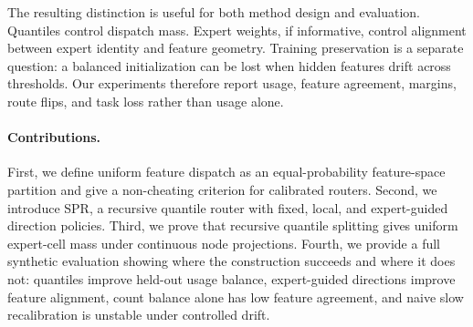 The resulting distinction is useful for both method design and evaluation.
Quantiles control dispatch mass.  Expert weights, if informative, control
alignment between expert identity and feature geometry.  Training preservation
is a separate question: a balanced initialization can be lost when hidden
features drift across thresholds.  Our experiments therefore report usage,
feature agreement, margins, route flips, and task loss rather than usage alone.

\paragraph{Contributions.}
First, we define uniform feature dispatch as an equal-probability feature-space
partition and give a non-cheating criterion for calibrated routers.  Second, we
introduce SPR, a recursive quantile router with fixed, local, and expert-guided
direction policies.  Third, we prove that recursive quantile splitting gives
uniform expert-cell mass under continuous node projections.  Fourth, we provide
a full synthetic evaluation showing where the construction succeeds and where
it does not: quantiles improve held-out usage balance, expert-guided directions
improve feature alignment, count balance alone has low feature agreement, and
naive slow recalibration is unstable under controlled drift.
